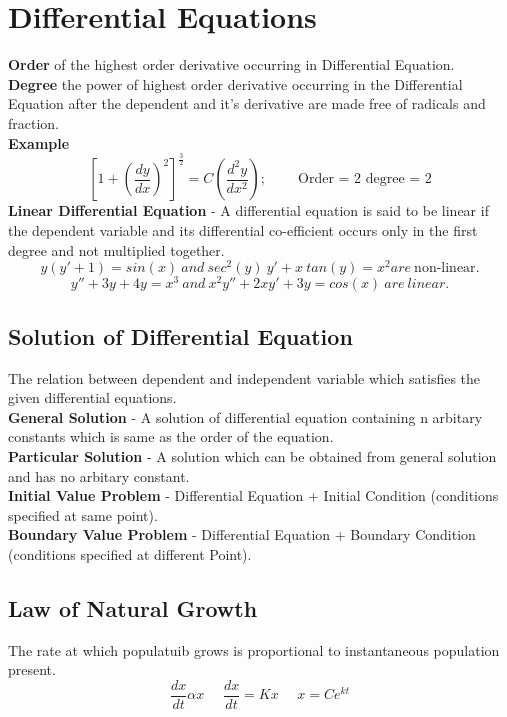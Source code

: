 \section{Differential Equations}
\textbf{Order} of the highest order derivative occurring in Differential Equation.\vspace{0.2cm}\\
\textbf{Degree} the power of highest order derivative occurring in the Differential Equation after the dependent and it's derivative are made free of radicals and fraction.\vspace{0.2cm}\\
\textbf{Example}
\[\left[1+\left(\frac{dy}{dx}\right)^2\right]^{\frac{3}{2}}=C\left(\frac{d^2y}{dx^2}\right);\ \ \ \ \ \ \ \ \ \ \text{Order = 2 degree = 2}\]
\textbf{Linear Differential Equation} - 
A differential equation is said to be linear if the dependent variable and its differential co-efficient occurs only in the first degree and not multiplied together.
\[y(y'+1)=sin(x)\ and\ sec^2(y)\ y'+x\ tan(y) = x^2 are\ \text{non-linear}.\]
\[y''+3y+4y=x^3\ and\ x^2y''+2xy'+3y=cos(x)\ are\ linear.\]
\subsection*{Solution of Differential Equation}
The relation between dependent and independent variable which satisfies the given differential equations.\vspace{0.2cm}\\
\textbf{General Solution} - A solution of differential equation containing n arbitary constants which is same as the order of the equation.\vspace{0.2cm}\\
\textbf{Particular Solution} - A solution which can be obtained from general solution and has no arbitary constant.\vspace{0.2cm}\\
\textbf{Initial Value Problem} - Differential Equation + Initial Condition (conditions specified at same point).\vspace{0.2cm}\\
\textbf{Boundary Value Problem} - Differential Equation + Boundary Condition (conditions specified at different Point).

\subsection*{Law of Natural Growth}
The rate at which populatuib grows is proportional to instantaneous population present.
\[\frac{dx}{dt}\alpha x\ \ \ \ \ \ \frac{dx}{dt}=Kx\ \ \ \ \ \ x=Ce^{kt}\]


